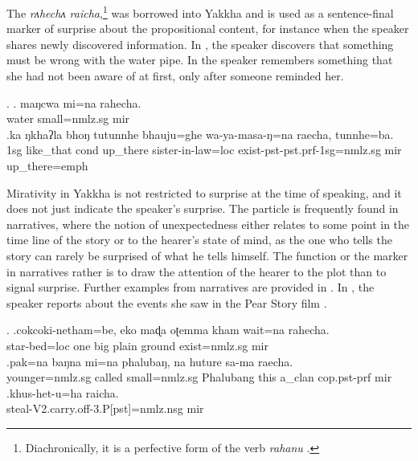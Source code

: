  The   \emph{rʌhechʌ \ti raicha},\footnote{Diachronically, it is a perfective form of the verb \emph{rahanu} .}  was borrowed into Yakkha and is used as a sentence-final marker of surprise about the propositional content, for instance when the speaker shares newly discovered information. In \Next[a], the speaker discovers that something must be wrong with the water pipe. In \Next[b] the speaker remembers something that she had not been aware of at first, only after someone reminded her.
 
 \ex. \ag. maŋcwa mi=na  rahecha.\\
 water small{\sc =nmlz.sg} {\sc mir}\\
 \bg.ka  ŋkhaʔla bhoŋ tutunnhe  bhauju=ghe    wa-ya-masa-ŋ=na    raecha, tunnhe=ba.\\
 {\sc 1sg} like\_that {\sc cond} up\_there sister-in-law{\sc =loc} exist{\sc -pst-pst.prf-1sg=nmlz.sg} {\sc mir} up\_there{\sc =emph}\\
  
 
 
Mirativity in Yakkha is not restricted to surprise at the time of speaking, and it does not just indicate the speaker's surprise. The  particle is frequently found in narratives, where the notion of unexpectedness either relates to some point in the time line of the story or to the hearer's state of mind, as the one who tells the story can rarely be surprised of what he tells himself. The function or the  marker in narratives rather is to draw the attention of the hearer to the plot than to signal surprise.  Further examples from narratives are provided in \Next. In \Next[c], the speaker reports about  the events she saw in the Pear Story film \citep{Chafe1980The-Pear}. 
 
 
 \ex. \ag.cokcoki-netham=be,       eko maɖa oʈemma kham  wait=na        rahecha.\\
 star-bed{\sc =loc} one big plain ground exist{\sc [3sg;npst]=nmlz.sg} {\sc mir}\\
 \bg.pak=na  baŋna mi=na  phalubaŋ, na   huture    sa-ma      raecha.\\
 younger{\sc =nmlz.sg} called small{\sc =nmlz.sg} Phalubang this a\_clan {\sc cop.pst-prf} {\sc mir}\\
 \bg.khus-het-u=ha  raicha.\\
	steal{\sc -V2.carry.off-3.P[pst]=nmlz.nsg} {\sc mir}\\
 
